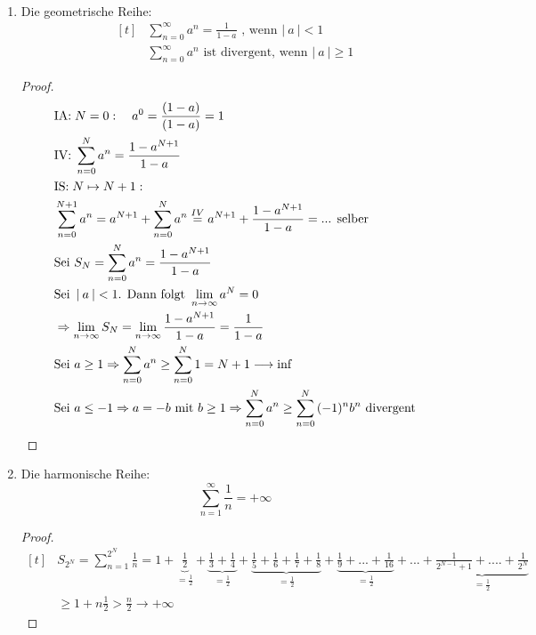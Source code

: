 \documentclass[a4paper,titlepage,oneside]{article}
\newcommand{\IA}[1][n=0]{\vspace{0.1pt}\ensuremath{\text{IA:}\sp#1:}}
\newcommand{\IV}{\vspace{0.1pt}\ensuremath{\text{IV:}\sp}}
\newcommand{\IS}[1][n \mapsto n+1]{\vspace{0.1pt}\ensuremath{\text{IS:}\sp#1:}}
\def\sp{\hspace{0,1cm}}
\newcommand{\suminf}[2][n]{\ensuremath{\sum_{#1= 0}^{\infty}{#2}}}
\renewcommand{\liminf}[2][n]{\ensuremath{\lim\limits_{#1 \rightarrow \infty}{#2}}}
\newcommand{\abs}[1]{\ensuremath{\left|\:#1\:\right|}}
\theoremstyle{thmstyle}
\begin{document}
\begin{subbsp}\
\begin{enumerate}
\item Die geometrische Reihe:
\[\begin{aligned}[t]
&\suminf{a^n} = \frac{1}{1-a} \text{ , wenn } \abs{a} < 1 \\
&\suminf{a^n} \text{ ist divergent, wenn } \abs{a} \ge 1
\end{aligned}\]

\begin{proof}
\[\begin{aligned}[t]
&\IA[N=0] \quad a^0 = \frac{(1-a)}{(1- a)} = 1 \\
&\IV \sum_{n = 0}^{N}{a^n} = \frac{1-a^{N+1}}{1-a} \\
&\IS[N \mapsto N+1] \\
&\sum_{n = 0}^{N+1}{a^n} = a^{N+1} + \sum_{n = 0}^{N}{a^n} \overset{IV}{=} a^{N+1} + \frac{1-a^{N+1}}{1-a} = \text{... selber} \\ %
&\text{Sei }S_N = \sum_{n=0}^{N}{a^n} = \frac{1 - a^{N+1}}{1- a} \\
&\text{Sei }\abs{a} < 1\text{. Dann folgt }\liminf{a^N} = 0 \\
&\Rightarrow \liminf{S_N} = \liminf{\frac{1-a^{N+1}}{1-a}} = \frac{1}{1-a} \\
&\text{Sei }a \ge 1 \Rightarrow \sum_{n=0}^{N}{a^n} \ge \sum_{n=0}^{N}{1} = N+1 \longrightarrow \inf \\
&\text{Sei }a \le -1 \Rightarrow a = -b \text{ mit }b \ge 1 \Rightarrow \sum_{n=0}^{N}{a^n} \ge \sum_{n=0}^{N}{(-1)^nb^n} \text{ divergent}
\end{aligned}\]
\end{proof}

\item Die harmonische Reihe:
\[\sum_{n=1}^{\infty}{\frac{1}{n}} = +\infty\]

\begin{proof}
\[\begin{aligned}[t]
&S_{2^N} = \sum_{n = 1}^{2^N}{\frac{1}{n}} =
1 +\underbrace{\frac{1}{2}}_{=\frac{1}{2}} + \underbrace{\frac{1}{3} + \frac{1}{4}}_{=\frac{1}{2}} + \underbrace{\frac{1}{5} + \frac{1}{6} + \frac{1}{7} + \frac{1}{8}}_{=\frac{1}{2}} + \underbrace{\frac{1}{9} + ... + \frac{1}{16}}_{=\frac{1}{2}} + ... + \underbrace{\frac{1}{2^{N-1}+1}+ .... + \frac{1}{2^N}}_{=\frac{1}{2}} \\
&\ge 1 + n \frac{1}{2} > \frac{n}{2} \longrightarrow +\infty
\end{aligned}\]


\end{proof}
\end{enumerate}
\end{subbsp}
\end{document}
